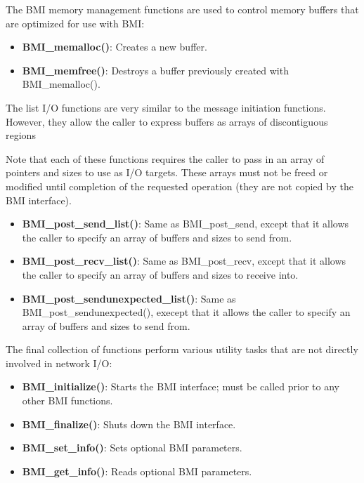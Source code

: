 \documentclass[11pt]{article}
\begin{document}
The BMI memory management functions are used to control memory buffers
that are optimized for use with BMI:

\begin{itemize}

\item \textbf{BMI\_memalloc()}:  Creates a new buffer. 
\item \textbf{BMI\_memfree()}:  Destroys a buffer previously
created with BMI\_memalloc().

\end{itemize}

The list I/O functions are very similar to the message initiation
functions.  However, they allow the caller to express buffers as
arrays of discontiguous regions

Note that each of these functions requires the caller to pass in
an array of pointers and sizes to use as I/O targets.  These
arrays must not be freed or modified until completion of the
requested operation (they are not copied by the BMI interface).

\begin{itemize}
\item \textbf{BMI\_post\_send\_list()}:  Same as BMI\_post\_send,
except that it allows the caller to specify an array of buffers
and sizes to send from.
\item \textbf{BMI\_post\_recv\_list()}:  Same as BMI\_post\_recv,
except that it allows the caller to specify an array of buffers
and sizes to receive into.
\item \textbf{BMI\_post\_sendunexpected\_list()}:  Same as
BMI\_post\_sendunexpected(), execept that it allows the caller to
specify an array of buffers and sizes to send from.
\end{itemize}

The final collection of functions perform various utility tasks that are
not directly involved in network I/O:

\begin{itemize}

\item \textbf{BMI\_initialize()}:  Starts the BMI interface; must
be called prior to any other BMI functions.
\item \textbf{BMI\_finalize()}:  Shuts down the BMI interface.
\item \textbf{BMI\_set\_info()}:  Sets optional BMI parameters.
\item \textbf{BMI\_get\_info()}:  Reads optional BMI parameters.

\end{itemize}
\end{document}
